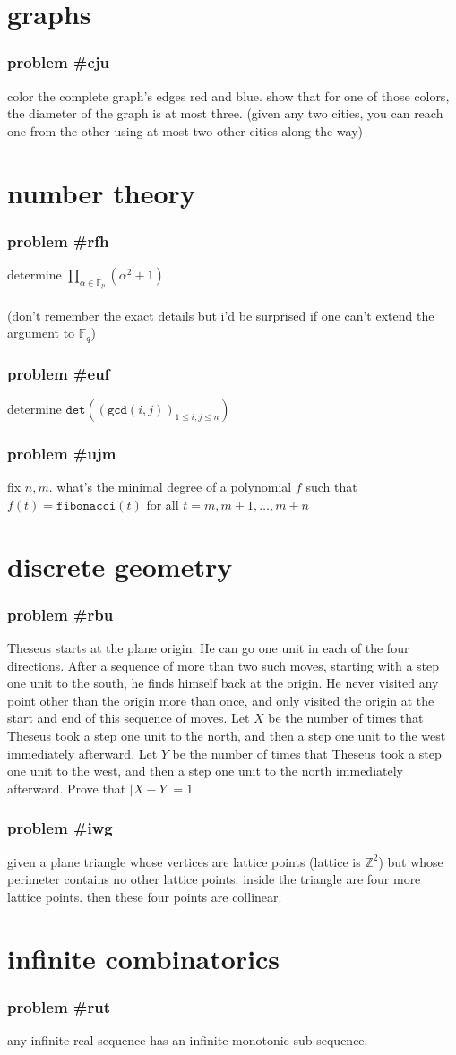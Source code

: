 \documentclass{article}
\newcommand{\problem}[1]{\subsubsection*{\textbf{problem \##1}}}
\newcommand{\chapter}[1]{\section*{#1}}
\newcommand{\Z}{\mathbb{Z}}
\newcommand{\F}{\mathbb{F}}
\newcommand{\FNC}[1]{\texttt{#1}}
\begin{document}
\chapter{graphs}
\problem{cju} color the complete graph's edges red and blue. show that for one of those colors, the diameter of the graph is at most three. (given any two cities, you can reach one from the other using at most two other cities along the way)
\chapter{number theory}
\problem{rfh} determine $\displaystyle{\prod_{\alpha\in\F_p}(\alpha^2+1)}$\\\\
(don't remember the exact details but i'd be surprised if one can't extend the argument to $\F_q$)
\problem{euf} determine $\FNC{det}((\FNC{gcd}(i,j))_{1\le i,j\le n})$
\problem{ujm} fix $n,m$. what's the minimal degree of a polynomial $f$ such that $f(t)=\FNC{fibonacci}(t)$ for all $t=m,m+1,\dots,m+n$
\chapter{discrete geometry}
\problem{rbu} Theseus starts at the plane origin. He can go one unit in each of the four directions. After a sequence
of more than two such moves, starting with a step one unit to the south, he finds himself back at the origin. He never visited any point other than the origin more than once, and only visited the origin at the start and end of this sequence of moves. Let $X$ be the number of times that Theseus took a step one unit to the north, and then a step one unit to the west immediately afterward. Let $Y$ be the number of times that Theseus took a step one unit to the west, and then a step one unit to the north immediately afterward. Prove that $|X-Y| = 1$
\problem{iwg} given a plane triangle whose vertices are lattice points (lattice is $\Z^2$) but whose perimeter contains no other lattice points. inside the triangle are four more lattice points. then these four points are collinear.
\chapter{infinite combinatorics}
\problem{rut} any infinite real sequence has an infinite monotonic sub sequence.
\end{document}
